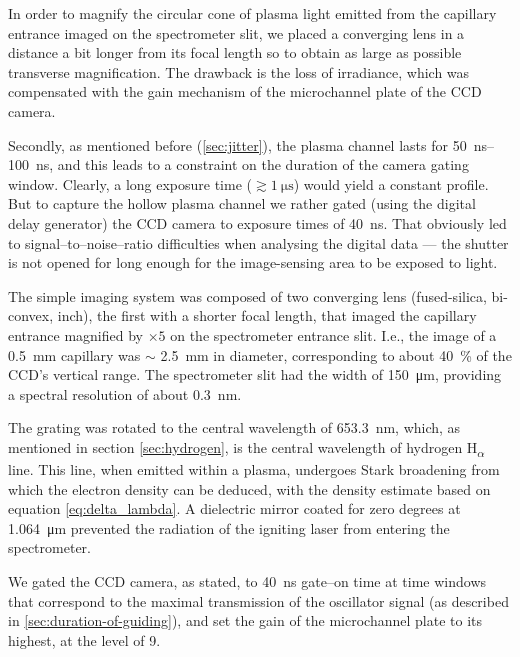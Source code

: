 \documentclass[../main.tex]{subfiles}
\begin{document}
In order to magnify the circular cone of plasma light emitted from the capillary entrance imaged on the spectrometer slit, we placed a converging lens in a distance a bit longer from its focal length so to obtain as large as possible transverse magnification. The drawback is the loss of irradiance, which was compensated with the gain mechanism of the microchannel plate of the CCD camera.

Secondly, as mentioned before (\ref{sec:jitter}), the plasma channel lasts for \SIrange{50}{100}{\ns}, and this leads to a constraint on the duration of the camera gating window. Clearly, a long exposure time ($\gtrsim \SI{1}{\us}$) would yield a constant profile. But to capture the hollow plasma channel we rather gated (using the digital delay generator) the CCD camera to exposure times of \SI{40}{\ns}. That obviously led to signal--to--noise--ratio difficulties when analysing the digital data --- the shutter is not opened for long enough for the image-sensing area to be exposed to light.

The simple imaging system was composed of two converging lens (fused-silica, bi-convex,  inch), the first with a shorter focal length, that imaged the capillary entrance magnified by $\times 5$ on the spectrometer entrance slit. I.e., the image of a \SI{0.5}{\mm} capillary was $\sim$ \SI{2.5}{\mm} in diameter, corresponding to about \SI{40}{\percent} of the CCD's vertical range. The spectrometer slit had the width of \SI{150}{\micro\metre}, providing a spectral resolution of about \SI{0.3}{\nm}.

The grating was rotated to the central wavelength of \SI{653.3}{\nm}, which, as mentioned in section \ref{sec:hydrogen}, is the central wavelength of hydrogen H\textsubscript{$\alpha$} line. This line, when emitted within a plasma, undergoes Stark broadening from which the electron density can be deduced, with the density estimate based on equation \ref{eq:delta_lambda}. A dielectric mirror coated for zero degrees at \SI{1.064}{\um} prevented the radiation of the igniting laser from entering the spectrometer.

We gated the CCD camera, as stated, to \SI{40}{\ns} gate--on time at time windows that correspond to the maximal transmission of the oscillator signal (as described in \ref{sec:duration-of-guiding}), and set the gain of the microchannel plate to its highest, at the level of 9.
\end{document}
